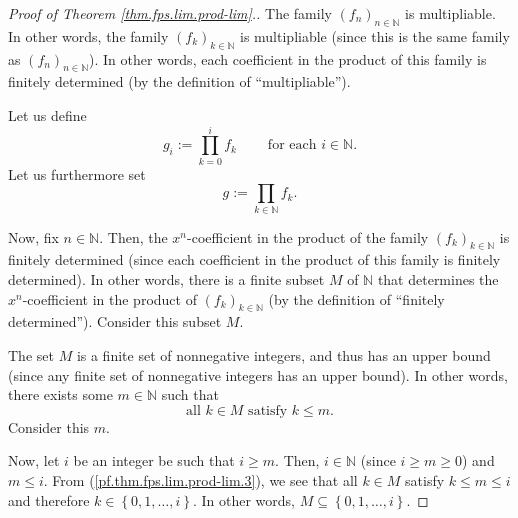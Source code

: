 \begin{fineprint}
\begin{proof}
[Proof of Theorem \ref{thm.fps.lim.prod-lim}.]The family $\left(
f_{n}\right)  _{n\in\mathbb{N}}$ is multipliable. In other words, the family
$\left(  f_{k}\right)  _{k\in\mathbb{N}}$ is multipliable (since this is the
same family as $\left(  f_{n}\right)  _{n\in\mathbb{N}}$). In other words,
each coefficient in the product of this family is finitely determined (by the
definition of \textquotedblleft multipliable\textquotedblright).

Let us define%
\begin{equation}
g_{i}:=\prod_{k=0}^{i}f_{k}\ \ \ \ \ \ \ \ \ \ \text{for each }i\in\mathbb{N}.
\label{pf.thm.fps.lim.prod-lim.gi=}%
\end{equation}
Let us furthermore set%
\begin{equation}
g:=\prod_{k\in\mathbb{N}}f_{k}. \label{pf.thm.fps.lim.prod-lim.g=}%
\end{equation}


Now, fix $n\in\mathbb{N}$. Then, the $x^{n}$-coefficient in the product of the
family $\left(  f_{k}\right)  _{k\in\mathbb{N}}$ is finitely determined (since
each coefficient in the product of this family is finitely determined). In
other words, there is a finite subset $M$ of $\mathbb{N}$ that determines the
$x^{n}$-coefficient in the product of $\left(  f_{k}\right)  _{k\in\mathbb{N}%
}$ (by the definition of \textquotedblleft finitely
determined\textquotedblright). Consider this subset $M$.

The set $M$ is a finite set of nonnegative integers, and thus has an upper
bound (since any finite set of nonnegative integers has an upper bound). In
other words, there exists some $m\in\mathbb{N}$ such that%
\begin{equation}
\text{all }k\in M\text{ satisfy }k\leq m. \label{pf.thm.fps.lim.prod-lim.3}%
\end{equation}
Consider this $m$.

Now, let $i$ be an integer be such that $i\geq m$. Then, $i\in\mathbb{N}$
(since $i\geq m\geq0$) and $m\leq i$. From (\ref{pf.thm.fps.lim.prod-lim.3}),
we see that all $k\in M$ satisfy $k\leq m\leq i$ and therefore $k\in\left\{
0,1,\ldots,i\right\}  $. In other words, $M\subseteq\left\{  0,1,\ldots
,i\right\}  $.


\end{proof}
\end{fineprint}
